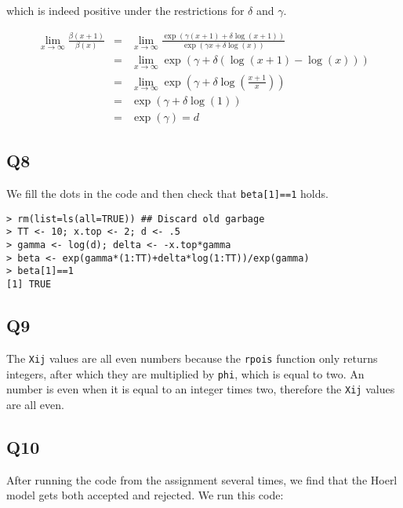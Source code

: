 \documentclass[11pt]{article}
\begin{document}
which is indeed positive under the restrictions for $\delta$ and $\gamma$.

\begin{eqnarray}
\lim_{x \to \infty} \frac{\beta(x+1)}{\beta(x)} &=& \lim_{x \to \infty} \frac{\exp(\gamma (x+1) + \delta \log(x+1))}{\exp(\gamma x + \delta \log(x))} \\
&=& \lim_{x \to \infty}  \exp(\gamma + \delta(\log(x+1) - \log(x))) \\
&=& \lim_{x \to \infty}  \exp(\gamma + \delta\log\left(\frac{x+1}{x}\right)) \\
&=&\exp(\gamma + \delta\log\left(1\right)) \\
&=&\exp(\gamma) = d
\end{eqnarray}

\subsection*{Q8}

We fill the dots in the code and then check that \verb|beta[1]==1| holds.

\begin{verbatim}
> rm(list=ls(all=TRUE)) ## Discard old garbage
> TT <- 10; x.top <- 2; d <- .5
> gamma <- log(d); delta <- -x.top*gamma
> beta <- exp(gamma*(1:TT)+delta*log(1:TT))/exp(gamma)
> beta[1]==1
[1] TRUE
\end{verbatim}

\subsection*{Q9}

The \verb|Xij| values are all even numbers because the \verb|rpois| function only returns integers, after which they are multiplied by \verb|phi|, which is equal to two. An number is even when it is equal to an integer times two, therefore the \verb|Xij| values are all even.

\subsection*{Q10}

After running the code from the assignment several times, we find that the Hoerl model gets both accepted and rejected. We run this code:
\end{document}
